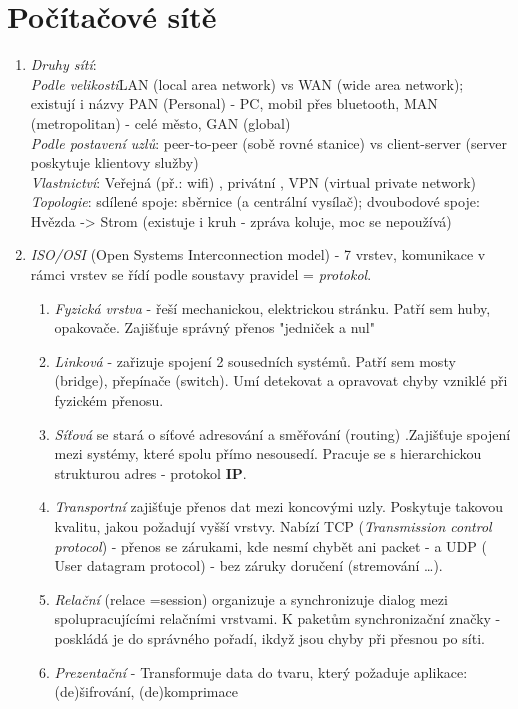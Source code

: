 \documentclass[12pt]{article}
\begin{document}
\section{Počítačové sítě}
\begin{enumerate}
\item \emph{Druhy sítí}:\\
\emph{Podle velikosti}LAN (local area network) vs WAN (wide area network); existují i názvy PAN (Personal) - PC, mobil přes bluetooth, MAN (metropolitan) - celé město, GAN (global)\\
\emph{Podle postavení uzlů}: peer-to-peer (sobě rovné stanice) vs client-server (server poskytuje klientovy služby)\\
\emph{Vlastnictví}: Veřejná (př.: wifi) , privátní , VPN (virtual private network)\\
\emph{Topologie}: 	sdílené spoje: sběrnice (a centrální vysílač); dvoubodové spoje: Hvězda -> Strom (existuje i kruh - zpráva koluje, moc se nepoužívá)
\item \emph{ISO/OSI} (Open Systems Interconnection model) - 7 vrstev, komunikace v rámci vrstev se řídí podle soustavy pravidel = \emph{protokol}.
\begin{enumerate}
\item \emph{Fyzická vrstva} - řeší mechanickou, elektrickou stránku. Patří sem huby, opakovače. Zajišťuje správný přenos "jedniček a nul"
\item \emph{Linková} - zařizuje spojení 2 sousedních systémů. Patří sem mosty (bridge), přepínače (switch). Umí detekovat a opravovat chyby vzniklé při fyzickém přenosu.
\item \emph{Síťová} se stará o síťové adresování a směřování (routing) .Zajišťuje spojení mezi systémy, které spolu přímo nesousedí. Pracuje se s hierarchickou strukturou adres - protokol \textbf{IP}.
\item \emph{Transportní} zajišťuje přenos dat mezi koncovými uzly. Poskytuje takovou kvalitu, jakou požadují vyšší vrstvy. Nabízí TCP (\emph{Transmission control protocol}) - přenos se zárukami, kde nesmí chybět ani packet - a UDP ( User datagram protocol) - bez záruky doručení (stremování \dots).
\item \emph{Relační} (relace =session)  organizuje a synchronizuje dialog mezi spolupracujícími relačními vrstvami. K paketům synchronizační značky - poskládá je do správného pořadí, ikdyž jsou chyby při přesnou po síti.
\item \emph{Prezentační} - Transformuje data do tvaru, který požaduje aplikace: (de)šifrování, (de)komprimace

\end{enumerate}
\end{enumerate}
\end{document}
